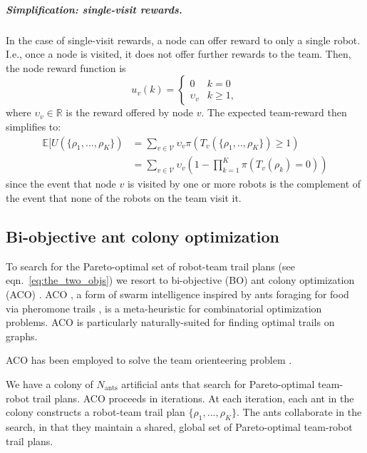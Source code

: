 \documentclass[11pt, oneside]{article}
\begin{document}
\vspace{-\baselineskip}
\subparagraph{Simplification: single-visit rewards.}
In the case of single-visit rewards, a node can offer reward to only a single robot. I.e., once a node is visited, it does not offer further rewards to the team. Then, the node reward function is
\begin{equation}
	u_v(k) = \begin{cases}
		0 & k = 0 \\
		\upsilon_v & k \geq 1,
	\end{cases}
\end{equation} where $\upsilon_v \in \mathbb{R}$ is the reward offered by node $v$. The expected team-reward then simplifies to:
\begin{align}
	\mathbb{E}[U(\{\rho_1, ..., \rho_K\}) & = \sum_{v \in \mathcal{V} } \upsilon_v \pi(T_v(\{\rho_1, .., \rho_K\}) \geq 1) \\
		      & = \sum_{v \in \mathcal{V} } \upsilon_v \left(1 - \prod_{k=1}^K  \pi(T_v(\rho_k) =0) \right) 
\end{align} since the event that node $v$ is visited by one or more robots is the complement of the event that none of the robots on the team visit it.



\subsection{Bi-objective ant colony optimization}
To search for the Pareto-optimal set of robot-team trail plans (see eqn.~\ref{eq:the_two_objs}) we resort to bi-objective (BO) ant colony optimization (ACO) \cite{iredi2001bi}. 
ACO \cite{dorigo2006ant}, a form of swarm intelligence \cite{bonabeau1999swarm} inspired by ants foraging for food via pheromone trails \cite{bonabeau2000inspiration}, is a meta-heuristic for combinatorial optimization problems. ACO is particularly naturally-suited for finding optimal trails on graphs. 

ACO has been employed to solve the team orienteering problem \cite{ke2008ants}.

We have a colony of $N_{\text{ants}}$ artificial ants that search for Pareto-optimal team-robot trail plans. 
ACO proceeds in iterations. 
At each iteration, each ant in the colony constructs a robot-team trail plan $\{\rho_1, ..., \rho_K\}$. 
The ants collaborate in the search, in that they maintain a shared, global set of Pareto-optimal team-robot trail plans.
\end{document}
